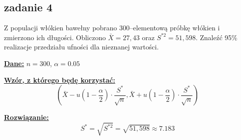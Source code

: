 \subsection{zadanie 4}
Z populacji włókien bawełny pobrano $300$--elementową próbkę włókien i zmierzono ich długości. Obliczono $\bar X = 27,43$ oraz $S^{*2} =51,598$. Znaleźć 95\% realizacje przedziału ufności dla nieznanej wartości.

\textbf{\underline{Dane:}} $n = 300$, $\alpha = 0.05$
\newline

\textbf{\underline{Wzór, z którego będę korzystać:}}
$$
\left(
\bar X - u \left(1-\frac{\alpha}{2} \right)  \cdot \frac{S^{*}}{\sqrt{n}},
\bar X + u \left(1-\frac{\alpha}{2} \right)  \cdot \frac{S^{*}}{\sqrt{n}}
\right)
$$

\textbf{\underline{Rozwiązanie:}}
$$S^{*} = \sqrt{S^{*2}} = \sqrt{51,598} \approx 7.183$$

